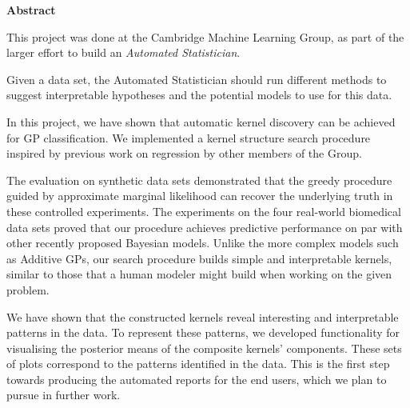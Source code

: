 \newpage
{\Huge \bf Abstract}
\vspace{24pt}

This project was done at the Cambridge Machine Learning Group, as part of the larger effort to build an \emph{Automated Statistician}.

Given a data set, the Automated Statistician should run different methods to suggest interpretable hypotheses and the potential models to use for this data.

In this project, we have shown that automatic kernel discovery can be achieved for GP classification. We implemented a kernel structure search procedure inspired by previous work on regression by other members of the Group.

The evaluation on synthetic data sets demonstrated that the greedy procedure guided by approximate marginal likelihood can recover the underlying truth in these controlled experiments. The experiments on the four real-world biomedical data sets proved that our procedure achieves predictive performance on par with other recently proposed Bayesian models. Unlike the more complex models such as Additive GPs, our search procedure builds simple and interpretable kernels, similar to those that a human modeler might build when working on the given problem.

We have shown that the constructed kernels reveal interesting and interpretable patterns in the data. To represent these patterns, we developed functionality for visualising the posterior means of the composite kernels' components. These sets of plots correspond to the patterns identified in the data. This is the first step towards producing the automated reports for the end users, which we plan to pursue in further work.


\newpage


\vspace*{\fill}
